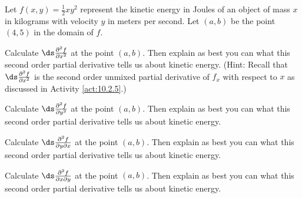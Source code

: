 \begin{activity} \label{A:10.3.4} Let $f(x,y) = \frac{1}{2}xy^2$ represent the kinetic energy in Joules of an object of mass $x$ in
kilograms with velocity $y$ in meters per second. Let $(a,b)$ be the point $(4,5)$ in the domain of $f$.
	\ba
	\item Calculate $\ds \frac{ \partial^2 f}{\partial x^2}$ at the point $(a,b)$. Then explain as best you can what this second order partial
derivative tells us about kinetic energy. (Hint: Recall that $\ds \frac{ \partial^2 f}{\partial x^2}$ is the second order unmixed partial derivative of
$f_x$ with respect to $x$ as discussed in Activity \ref{act:10.2.5}.)



	\item Calculate $\ds \frac{ \partial^2 f}{\partial y^2}$ at the point $(a,b)$. Then explain as best you can what this second order partial
derivative tells us about kinetic energy.



	\item Calculate $\ds \frac{ \partial^2 f}{\partial y \partial x}$ at the point $(a,b)$. Then explain as best you can what this second order
partial derivative tells us about kinetic energy.



	\item Calculate $\ds \frac{ \partial^2 f}{\partial x \partial y}$ at the point $(a,b)$. Then explain as best you can what this second order
partial derivative tells us about kinetic energy.



	\ea

\end{activity}
\begin{smallhint}

\end{smallhint}
\begin{bighint}

\end{bighint}
